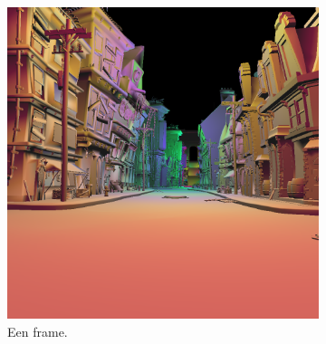 \begin{figure}[t]
  \begin{subfigure}[b]{0.6\textwidth}
    \centering\includegraphics[width=\textwidth]{./img/raw/test-suite-pipers-alley-frame.png}
    \caption{Een frame.}
    \label{fig:test-suite-pipers-alley-frame}
  \end{subfigure} %
  \begin{subfigure}[b]{0.3\textwidth}

\end{subfigure}
\end{figure}
